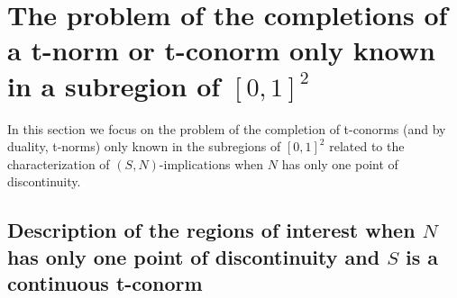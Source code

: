 \section[The problem of the completions of t-norms or t-conorms]{The problem of the completions of a t-norm or t-conorm only known in a subregion of $[0,1]^2$}\label{section:completions}
In this section we focus on the problem of the completion of t-conorms (and by duality, t-norms) only known in the subregions of $[0,1]^2$ related to the characterization of $(S,N)$-implications when $N$ has only one point of discontinuity.

\subsection{Description of the regions of interest when $N$ has only one point of discontinuity and $S$ is a continuous t-conorm}\label{subsection:decription_regions_interest}

